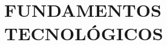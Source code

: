 \chapter[Fundamentos tecnológicos]{
  \label{chp:fundamentos}
  FUNDAMENTOS TECNOLÓGICOS
}
\thispagestyle{numberingStyle}
\pagestyle{numberingStyle}